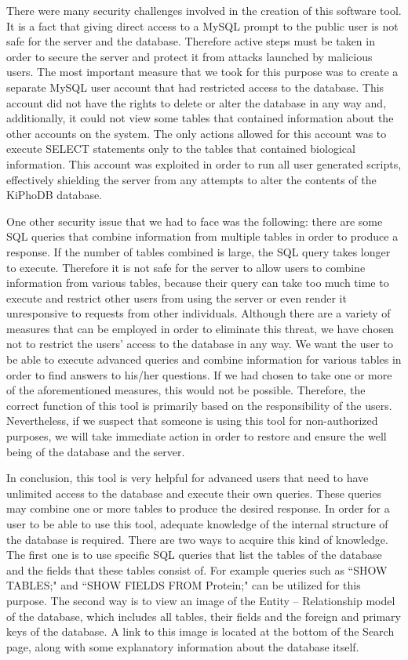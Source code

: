 There were many security challenges involved in the creation of this software tool.
It is a fact that giving direct access to a MySQL prompt to the public user is not safe for the server and the database.
Therefore active steps must be taken in order to secure the server and protect it from attacks launched by malicious users.
The most important measure that we took for this purpose was to create a separate MySQL user account that had restricted access to the database.
This account did not have the rights to delete or alter the database in any way and, additionally, it could not view some tables that contained information about the other accounts on the system.
The only actions allowed for this account was to execute SELECT statements only to the tables that contained biological information.
This account was exploited in order to run all user generated scripts, effectively shielding the server from any attempts to alter the contents of the KiPhoDB database.

One other security issue that we had to face was the following:
there are some SQL queries that combine information from multiple tables in order to produce a response.
If the number of tables combined is large, the SQL query takes longer to execute.
Therefore it is not safe for the server to allow users to combine information from various tables, because their query can take too much time to execute and restrict other users from using the server or even render it unresponsive to requests from other individuals.
Although there are a variety of measures that can be employed in order to eliminate this threat, we have chosen not to restrict the users' access to the database in any way.
We want the user to be able to execute advanced queries and combine information for various tables in order to find answers to his/her questions.
If we had chosen to take one or more of the aforementioned measures, this would not be possible.
Therefore, the correct function of this tool is primarily based on the responsibility of the users.
Nevertheless, if we suspect that someone is using this tool for non-authorized purposes, we will take immediate action in order to restore and ensure the well being of the database and the server.

In conclusion, this tool is very helpful for advanced users that need to have unlimited access to the database and execute their own queries.
These queries may combine one or more tables to produce the desired response.
In order for a user to be able to use this tool, adequate knowledge of the internal structure of the database is required.
There are two ways to acquire this kind of knowledge.
The first one is to use specific SQL queries that list the tables of the database and the fields that these tables consist of.
For example queries such as ``SHOW TABLES;" and ``SHOW FIELDS FROM Protein;" can be utilized for this purpose.
The second way is to view an image of the Entity -- Relationship model of the database, which includes all tables, their fields and the foreign and primary keys of the database.
A link to this image is located at the bottom of the Search page, along with some explanatory information about the database itself.

